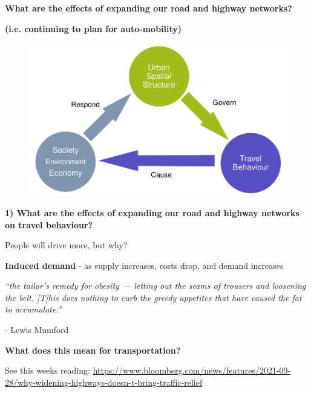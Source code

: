\documentclass[aspectratio=169]{beamer}
\begin{document}
\begin{frame}
	
	\textbf{What are the effects of expanding our road and highway networks?} 
			
	\textbf{(i.e. continuing to plan for auto-mobility)}
	
	\begin{figure}
		\centering
		\includegraphics[width=0.79\linewidth]{images/big_links.png}
	\end{figure}
	
\end{frame}


\begin{frame}
	
	\textbf{1) What are the effects of expanding our road and highway networks on travel behaviour?}
	
	\vspace{4mm}
	
	People will drive more, but why?
	

	
\end{frame}






\begin{frame}

	\textbf{Induced demand} - as supply increases, costs drop, and demand increases 
	
	\vspace{2mm}
	
	\textit{“the tailor’s remedy for obesity — letting out the seams of trousers and loosening the belt. [T]his does nothing to curb the greedy appetites that have caused the fat to accumulate.”}
	
	- Lewis Mumford
	
	\vspace{4mm}
	
	\textbf{What does this mean for transportation?}
	
	
	\vspace{8mm}
	
	
	\small See this weeks reading: \url{https://www.bloomberg.com/news/features/2021-09-28/why-widening-highways-doesn-t-bring-traffic-relief}


\end{frame}
\end{document}
